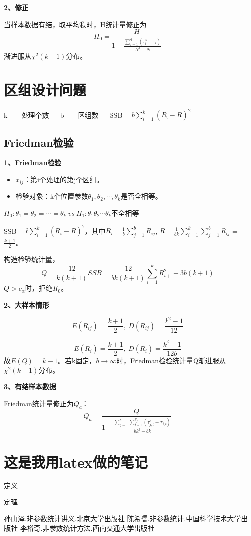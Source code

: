 \documentclass[lang=cn,10pt]{elegantbook}
\begin{document}
\textbf{2、修正}

当样本数据有结，取平均秩时，H统计量修正为
$$
H_0 = \frac H{1-\frac{\sum_{i = 1}^g (\tau_i^3 - \tau_i)}{N^3 - N}}
$$
渐进服从$\chi^2 (k - 1)$分布。

\chapter{区组设计问题}
\begin{center}
    k——处理个数 ~~ b——区组数 ~~ SSB$ = b \sum_{i = 1}^{k} (\bar{R}_i - \bar{R})^2$
\end{center}
\section{Friedman检验}
\textbf{1、Friedman检验}
\begin{itemize}
    \item $x_{ij}$：第i个处理的第j个区组。
    \item 检验对象：k个位置参数$\theta_1,\theta_2,\cdots,\theta_k$是否全相等。
\end{itemize}

\begin{center}
    $H_0:\theta_1 = \theta_2 = \cdots = \theta_k ~vs~ H_1: \theta_1 \theta_2 \cdots \theta_k$不全相等
\end{center}

SSB$ = b \sum_{i = 1}^{k} (\bar{R}_i - \bar{R})^2$，其中$\bar{R}_i = \frac1{b} \sum_{j = 1}^{b} R_{ij}$, $\bar{R} = \frac1{bk} \sum_{i = 1}^{k}\sum_{j = 1}^{b} R_{ij}$ = $\frac{k+1}{2}$。

构造检验统计量，
$$ 
Q = \frac{12}{k(k+1)}SSB = \frac{12}{bk(k+1)}\sum_{i = 1}^{k} R_{i+}^2 - 3 b(k+1)
$$
$Q > c_{\alpha}$时，拒绝$H_0$。

\textbf{2、大样本情形}

$$
E(R_{ij}) = \frac{k+1}2, ~ D(R_{ij}) = \frac{k^2-1}{12}
$$

$$
E(\bar{R}_i) = \frac{k+1}2, ~ D(\bar{R}_i) = \frac{k^2-1}{12b}
$$
故$E(Q) = k-1$。若k固定，$b \rightarrow \infty$时，Friedman检验统计量Q渐进服从$\chi^2(k-1)$分布。

\textbf{3、有结样本数据}

Friedman统计量修正为$Q_a$：
$$
Q_a = \frac{Q}{1 - \frac{\sum_{j = 1}^{b}\sum_{t = 1}^{g_j} (\tau_{j,t}^3 - \tau_{j,t})}{bk^3 - bk}}
$$

\chapter{这是我用latex做的笔记}

\begin{definition}
    定义
\end{definition}

\begin{theorem}
    定理
\end{theorem}




\begin{thebibliography}{3}
    孙山泽.非参数统计讲义.北京大学出版社
    陈希孺.非参数统计.中国科学技术大学出版社
    李裕奇.非参数统计方法.西南交通大学出版社
\end{thebibliography}
\end{document}
